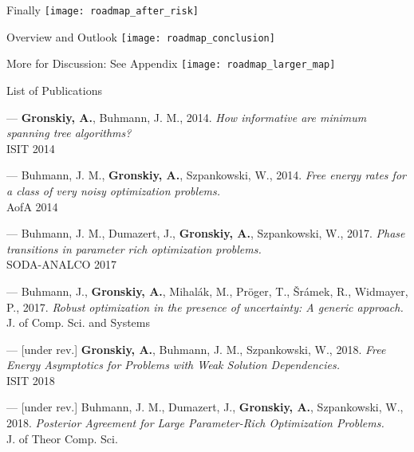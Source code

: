 \documentclass[presentation,12pt]{beamer}
\newcommand{\setroadmapfootline}{%
\setfootline{%
  \textcolor{gray!60}{%
    \tiny\insertshortdate \hfill \insertshortauthor \quad 
    \phantom{\insertframenumber/\inserttotalframenumber}
  }%
}%
}
\begin{document}
{\setroadmapfootline \begin{frame}[noframenumbering]{Finally}
\centering
\texttt{[image: roadmap\_after\_risk]} 
\end{frame}}

{\setroadmapfootline \begin{frame}[noframenumbering]{Overview and Outlook}
\centering
\texttt{[image: roadmap\_conclusion]} 
\end{frame}}

{\setroadmapfootline
\begin{frame}[noframenumbering]{More for Discussion: See Appendix}
\centering
\vspace*{3pt}
\hspace*{-.4cm}\texttt{[image: roadmap\_larger\_map]} 
\end{frame}}

{\setroadmapfootline
\begin{frame}[noframenumbering]{List of Publications}

\scriptsize

    --- \textbf{Gronskiy, A.}, Buhmann, J. M., 2014. \textit{How informative are minimum
    spanning tree algorithms?} \\
    ISIT 2014
    \medskip

    --- Buhmann, J. M., \textbf{Gronskiy, A.}, Szpankowski, W., 2014. \textit{Free energy rates
    for a class of very noisy optimization problems.} \\
    AofA 2014
    \medskip

    --- Buhmann, J. M., Dumazert, J., \textbf{Gronskiy, A.}, Szpankowski, W., 2017. \textit{Phase
    transitions in parameter rich optimization problems.} \\
    SODA-ANALCO
    2017
    \medskip

    --- Buhmann, J., \textbf{Gronskiy, A.}, Mihal\'ak, M., Pr\"oger, T.,
    \v{S}r\'amek, R., Widmayer, P., 2017. \textit{Robust optimization in the presence of
    uncertainty: A generic approach.} \\
    J. of Comp. Sci. and Systems
    \medskip

    --- [under rev.] \textbf{Gronskiy, A.}, Buhmann, J. M., Szpankowski, W., 2018. \textit{Free Energy Asymptotics
    for Problems with Weak Solution Dependencies.} \\
    ISIT 2018
    \medskip

    --- [under rev.] Buhmann, J. M., Dumazert, J., \textbf{Gronskiy, A.}, Szpankowski, W., 2018.
    \textit{Posterior Agreement for Large Parameter-Rich Optimization Problems.} \\
    J. of Theor Comp. Sci.
\end{frame}}
\end{document}
